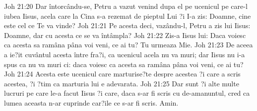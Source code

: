 Joh 21:20  Dar întorcându-se, Petru a vazut venind dupa el pe ucenicul pe care-l iubea Iisus, acela care la Cina s-a rezemat de pieptul Lui ?i I-a zis: Doamne, cine este cel ce Te va vinde?
Joh 21:21  Pe acesta deci, vazându-l, Petru a zis lui Iisus: Doamne, dar cu acesta ce se va întâmpla?
Joh 21:22  Zis-a Iisus lui: Daca voiesc ca acesta sa ramâna pâna voi veni, ce ai tu? Tu urmeaza Mie.
Joh 21:23  De aceea a ie?it cuvântul acesta între fra?i, ca ucenicul acela nu va muri; dar Iisus nu i-a spus ca nu va muri ci: daca voiesc ca acesta sa ramâna pâna voi veni, ce ai tu?
Joh 21:24  Acesta este ucenicul care marturise?te despre acestea ?i care a scris acestea, ?i ?tim ca marturia lui e adevarata.
Joh 21:25  Dar sunt ?i alte multe lucruri pe care le-a facut Iisus ?i care, daca s-ar fi scris cu de-amanuntul, cred ca lumea aceasta n-ar cuprinde car?ile ce s-ar fi scris. Amin.


